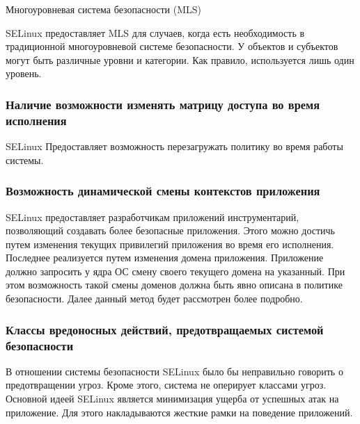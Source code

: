 \bigskip
Многоуровневая система безопасности (MLS) 

SELinux предоставляет MLS для случаев, когда есть 
необходимость в традиционной многоуровневой системе 
безопасности. У объектов и субъектов могут быть 
различные уровни и категории. 
Как правило, используется лишь один уровень. 

\subsubsection{Наличие возможности изменять матрицу доступа 
	во время исполнения} 

SELinux Предоставляет возможность перезагружать 
	политику во время работы системы. 

\subsubsection{Возможность динамической смены контекстов 
приложения} 
 
SELinux предоставляет разработчикам приложений 
инструментарий, позволяющий создавать более 
безопасные приложения. Этого можно достичь 
путем изменения текущих привилегий приложения 
во время его исполнения. 
Последнее реализуется путем изменения домена приложения. 
Приложение должно запросить у ядра ОС смену своего 
текущего домена на указанный. При этом возможность
такой смены доменов должна быть явно описана в 
политике безопасности. Далее данный метод будет
рассмотрен более подробно.  

\subsubsection{Классы вредоносных действий, предотвращаемых 
	системой безопасности} 

В отношении системы безопасности SELinux было бы неправильно 
говорить о предотвращении угроз. Кроме этого, система не 
оперирует классами угроз. Основной идеей SELinux является 
минимизация ущерба от успешных атак на приложение. Для 
этого накладываются жесткие рамки на поведение приложений. 


